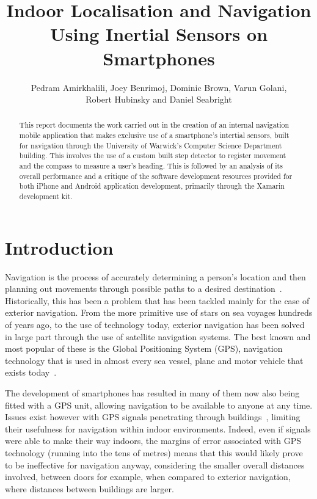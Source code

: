 \documentclass[12pt,a4paper]{report}
\title{Indoor Localisation and Navigation Using Inertial Sensors on Smartphones}
\author{Pedram Amirkhalili, Joey Benrimoj,  Dominic Brown, Varun Golani, \\Robert Hubinsky and Daniel Seabright  }
\date{}
\begin{document}
\maketitle

\tableofcontents

\pagebreak

\begin{abstract}
This report documents the work carried out in the creation of an internal navigation mobile application that makes exclusive use of a smartphone's intertial sensors, built for navigation through the University of Warwick's Computer Science Department building. This involves the use of a custom built step detector to register movement and the compass to measure a user's heading. This is followed by an analysis of its overall performance and a critique of the software development resources provided for both iPhone and Android application development, primarily through the Xamarin development kit.
\end{abstract}

\chapter{Introduction}

Navigation is the process of accurately determining a person's location and then planning out movements through possible paths to a desired destination~\cite{navMeaning}. Historically, this has been a problem that has been tackled mainly for the case of exterior navigation. From the more primitive use of stars on sea voyages hundreds of years ago, to the use of technology today, exterior navigation has been solved in large part through the use of satellite navigation systems. The best known and most popular of these is the Global Positioning System (GPS), navigation technology that is used in almost every sea vessel, plane and motor vehicle that exists today~\cite{gps}.

The development of smartphones has resulted in many of them now also being fitted with a GPS unit, allowing navigation to be available to anyone at any time. Issues exist however with GPS signals penetrating through buildings~\cite{gps}, limiting their usefulness for navigation within indoor environments. Indeed, even if signals were able to make their way indoors, the margins of error associated with GPS technology (running into the tens of metres) means that this would likely prove to be ineffective for navigation anyway, considering the smaller overall distances involved, between doors for example, when compared to exterior navigation, where distances between buildings are larger.
\end{document}
